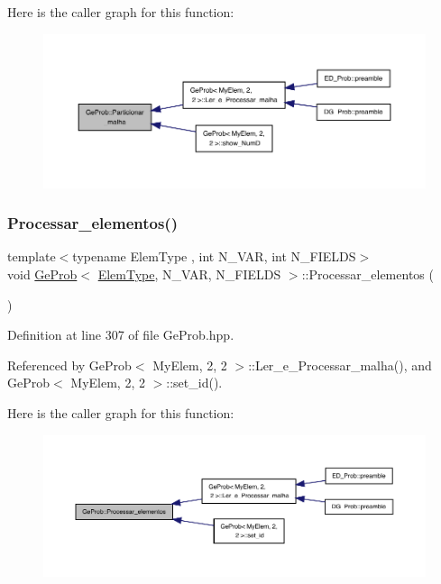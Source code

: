 Here is the caller graph for this function\+:
\nopagebreak
\begin{figure}[H]
\begin{center}
\leavevmode
\includegraphics[width=350pt]{classGeProb_ac439ec4e4198924d385d8948edb20708_icgraph}
\end{center}
\end{figure}
\mbox{\label{classGeProb_abe608186b9102498672c115584169d9a}} 
\subsubsection{\texorpdfstring{Processar\+\_\+elementos()}{Processar\_elementos()}}
{\footnotesize\ttfamily template$<$typename Elem\+Type , int N\+\_\+\+V\+AR, int N\+\_\+\+F\+I\+E\+L\+DS$>$ \\
void \hyperlink{classGeProb}{Ge\+Prob}$<$ \hyperlink{spectral_8h_aaa2c1a7b2d1b12c590d730fe6ac839fa}{Elem\+Type}, N\+\_\+\+V\+AR, N\+\_\+\+F\+I\+E\+L\+DS $>$\+::Processar\+\_\+elementos (\begin{DoxyParamCaption}{ }\end{DoxyParamCaption})}



Definition at line 307 of file Ge\+Prob.\+hpp.



Referenced by Ge\+Prob$<$ My\+Elem, 2, 2 $>$\+::\+Ler\+\_\+e\+\_\+\+Processar\+\_\+malha(), and Ge\+Prob$<$ My\+Elem, 2, 2 $>$\+::set\+\_\+id().

Here is the caller graph for this function\+:
\nopagebreak
\begin{figure}[H]
\begin{center}
\leavevmode
\includegraphics[width=350pt]{classGeProb_abe608186b9102498672c115584169d9a_icgraph}
\end{center}
\end{figure}
\mbox{\label{classGeProb_a18cfc81b7accb83b55b9e69d2738c5de}} 
